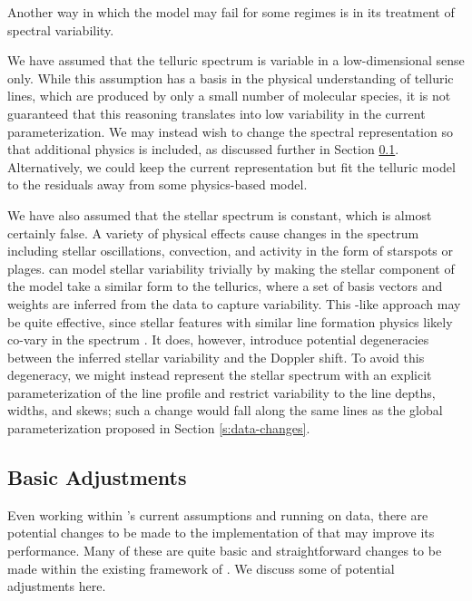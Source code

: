 \documentclass[modern]{aastex62}
\begin{document}
Another way in which the \wobble model may fail for some regimes is in its treatment of spectral variability.

We have assumed that the telluric spectrum is variable in a low-dimensional sense only. 
While this assumption has a basis in the physical understanding of telluric lines, which are produced by only a small number of molecular species, it is not guaranteed that this reasoning translates into low variability in the current parameterization. 
We may instead wish to change the spectral representation so that additional physics is included, as discussed further in Section \ref{s:improvements}. 
Alternatively, we could keep the current representation but fit the telluric model to the residuals away from some physics-based model. 

We have also assumed that the stellar spectrum is constant, which is almost certainly false. 
A variety of physical effects cause changes in the spectrum including stellar oscillations, convection, and activity in the form of starspots or plages. 
\wobble can model stellar variability trivially by making the stellar component of the model take a similar form to the tellurics, where a set of basis vectors and weights are inferred from the data to capture variability. 
This \PCA-like approach may be quite effective, since stellar features with similar line formation physics likely co-vary in the spectrum \citep{Davis2017, Dumusque2018}. 
It does, however, introduce potential degeneracies between the inferred stellar variability and the Doppler shift. 
To avoid this degeneracy, we might instead represent the stellar spectrum with an explicit parameterization of the line profile and restrict variability to the line depths, widths, and skews; such a change would fall along the same lines as the global \LSF parameterization proposed in Section \ref{s:data-changes}.



\subsection{Basic Adjustments}
\label{s:improvements}

Even working within \wobble's current assumptions and running on \HARPS data, there are potential changes to be made to the implementation of \wobble that may improve its performance. 
Many of these are quite basic and straightforward changes to be made within the existing framework of \wobble. 
We discuss some of potential adjustments here.
\end{document}
